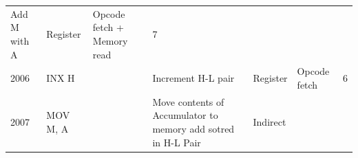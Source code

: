 \documentclass[11pt,twocolumn]{article}
\begin{document}
\begin{longtable}[]{@{}lllllll@{}}
\begin{minipage}[t]{0.37\columnwidth}
Add M with A\strut
\end{minipage} & \begin{minipage}[t]{0.09\columnwidth}\raggedright
Register\strut
\end{minipage} & \begin{minipage}[t]{0.17\columnwidth}\raggedright
Opcode fetch + Memory read\strut
\end{minipage} & \begin{minipage}[t]{0.05\columnwidth}\raggedright
7\strut
\end{minipage}\tabularnewline
\begin{minipage}[t]{0.04\columnwidth}\raggedright
2006\strut
\end{minipage} & \begin{minipage}[t]{0.05\columnwidth}\raggedright
INX H\strut
\end{minipage} & \begin{minipage}[t]{0.05\columnwidth}\raggedright
\strut
\end{minipage} & \begin{minipage}[t]{0.37\columnwidth}\raggedright
Increment H-L pair\strut
\end{minipage} & \begin{minipage}[t]{0.09\columnwidth}\raggedright
Register\strut
\end{minipage} & \begin{minipage}[t]{0.17\columnwidth}\raggedright
Opcode fetch\strut
\end{minipage} & \begin{minipage}[t]{0.05\columnwidth}\raggedright
6\strut
\end{minipage}\tabularnewline
\begin{minipage}[t]{0.04\columnwidth}\raggedright
2007\strut
\end{minipage} & \begin{minipage}[t]{0.05\columnwidth}\raggedright
MOV M, A\strut
\end{minipage} & \begin{minipage}[t]{0.05\columnwidth}\raggedright
\strut
\end{minipage} & \begin{minipage}[t]{0.37\columnwidth}\raggedright
Move contents of Accumulator to memory add sotred in H-L Pair\strut
\end{minipage} & \begin{minipage}[t]{0.09\columnwidth}\raggedright
Indirect\strut
\end{minipage} & \begin{minipage}[t]{0.17\columnwidth}\raggedright

\end{minipage}
\end{longtable}
\end{document}
